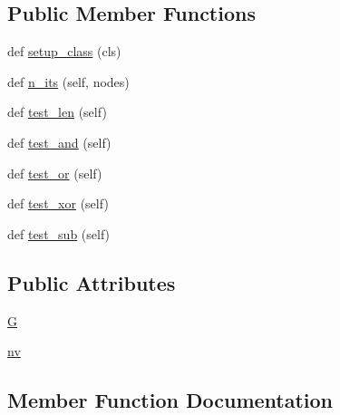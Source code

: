 \subsection*{Public Member Functions}
\begin{DoxyCompactItemize}
\item 
def \hyperlink{classnetworkx_1_1classes_1_1tests_1_1test__reportviews_1_1TestNodeViewSetOps_a7262c35f4ee5ebd92f080a114259153d}{setup\+\_\+class} (cls)
\item 
def \hyperlink{classnetworkx_1_1classes_1_1tests_1_1test__reportviews_1_1TestNodeViewSetOps_adf0c807cd403b7a3bf7346c3f1a8f6df}{n\+\_\+its} (self, nodes)
\item 
def \hyperlink{classnetworkx_1_1classes_1_1tests_1_1test__reportviews_1_1TestNodeViewSetOps_a37fe6dae80915ac8d600064fe9d5eeb3}{test\+\_\+len} (self)
\item 
def \hyperlink{classnetworkx_1_1classes_1_1tests_1_1test__reportviews_1_1TestNodeViewSetOps_a34010ad2d107978ff3c6f3d5131fbc86}{test\+\_\+and} (self)
\item 
def \hyperlink{classnetworkx_1_1classes_1_1tests_1_1test__reportviews_1_1TestNodeViewSetOps_a258e003101d89069c76781085a54e656}{test\+\_\+or} (self)
\item 
def \hyperlink{classnetworkx_1_1classes_1_1tests_1_1test__reportviews_1_1TestNodeViewSetOps_af4675d1cddfd73d10dd860b47171d269}{test\+\_\+xor} (self)
\item 
def \hyperlink{classnetworkx_1_1classes_1_1tests_1_1test__reportviews_1_1TestNodeViewSetOps_ae400bf7af7943c6097cb9454ecfe9dbd}{test\+\_\+sub} (self)
\end{DoxyCompactItemize}
\subsection*{Public Attributes}
\begin{DoxyCompactItemize}
\item 
\hyperlink{classnetworkx_1_1classes_1_1tests_1_1test__reportviews_1_1TestNodeViewSetOps_a12d2d7200754d5ba99219c0cce666061}{G}
\item 
\hyperlink{classnetworkx_1_1classes_1_1tests_1_1test__reportviews_1_1TestNodeViewSetOps_a9830dc57718d5e3552058a5a8dc5a376}{nv}
\end{DoxyCompactItemize}


\subsection{Member Function Documentation}
\mbox{\label{classnetworkx_1_1classes_1_1tests_1_1test__reportviews_1_1TestNodeViewSetOps_adf0c807cd403b7a3bf7346c3f1a8f6df}} 
